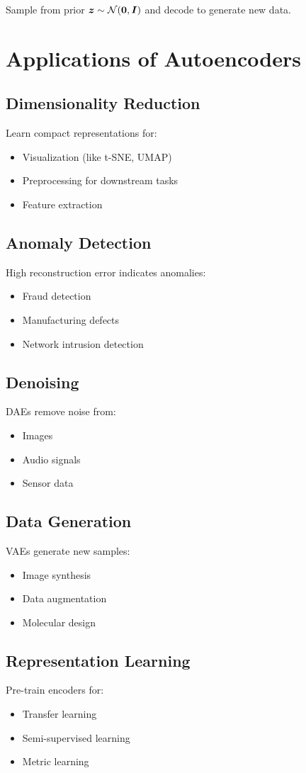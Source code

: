 Sample from prior $\boldsymbol{z} \sim \mathcal{N}(\boldsymbol{0}, \boldsymbol{I})$ and decode to generate new data.

\section{Applications of Autoencoders}
\label{sec:ae-applications}

\subsection{Dimensionality Reduction}

Learn compact representations for:
\begin{itemize}
    \item Visualization (like t-SNE, UMAP)
    \item Preprocessing for downstream tasks
    \item Feature extraction
\end{itemize}

\subsection{Anomaly Detection}

High reconstruction error indicates anomalies:
\begin{itemize}
    \item Fraud detection
    \item Manufacturing defects
    \item Network intrusion detection
\end{itemize}

\subsection{Denoising}

DAEs remove noise from:
\begin{itemize}
    \item Images
    \item Audio signals
    \item Sensor data
\end{itemize}

\subsection{Data Generation}

VAEs generate new samples:
\begin{itemize}
    \item Image synthesis
    \item Data augmentation
    \item Molecular design
\end{itemize}

\subsection{Representation Learning}

Pre-train encoders for:
\begin{itemize}
    \item Transfer learning
    \item Semi-supervised learning
    \item Metric learning
\end{itemize}
